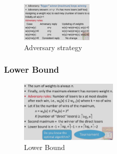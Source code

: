 \begin{figure}[!htb]
    \centering
    \includegraphics[width=0.309\textwidth]{pic/DAA2/Adversary}
    \caption{Adversary strategy}
\end{figure}

\subsubsection{Lower Bound}
\begin{figure}[!htb]
    \centering
    \includegraphics[width=0.42\textwidth]{pic/DAA2/Lower Bound}
    \caption{Lower Bound}
\end{figure}